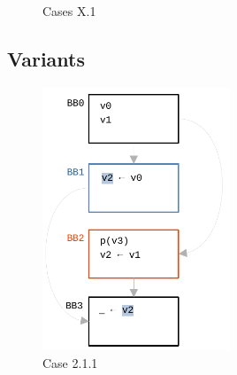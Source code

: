 \documentclass[12pt]{article}
\begin{document}
\begin{figure}[h!]
  \centering
   \hfill
  \caption{Cases X.1}
\end{figure}

\pagebreak

\subsection{Variants}

\begin{figure}[h!]
  \centering
  \includegraphics[width=0.5\textwidth]{examples/case_2_1_1}
  \caption{Case 2.1.1}
\end{figure}
\end{document}
